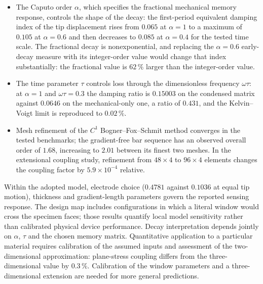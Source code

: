 \begin{itemize}
  couplings spans $2.9\times10^{-4}$ to $7.0\times10^{-3}$ and reaches
  $0.1\,\%$ only below $h=5.3\,\si{\micro\meter}$.
\item The Caputo order $\alpha$, which specifies the fractional mechanical memory response, controls the shape of the decay: the first-period
  equivalent damping index of the tip displacement rises from $0.065$ at
  $\alpha=1$ to a maximum of $0.105$ at $\alpha=0.6$ and then decreases
  to $0.085$ at $\alpha=0.4$ for
  the tested time scale. The fractional decay is nonexponential, and replacing
  the $\alpha=0.6$ early-decay measure with its integer-order value would change that index substantially: the fractional value is
  $62\,\%$ larger than the integer-order value.
\item The time parameter $\tau$ controls loss through the
  dimensionless frequency $\omega\tau$: at $\alpha=1$ and
  $\omega\tau=0.3$ the damping ratio is $0.15003$ on the condensed matrix
  against $0.0646$ on the mechanical-only one, a ratio of $0.431$, and the
  Kelvin--Voigt limit is reproduced to $0.02\,\%$.
\item Mesh refinement of the $C^1$ Bogner--Fox--Schmit method converges
  in the tested benchmarks; the gradient-free bar sequence has
  an observed overall order of $1.68$, increasing to $2.01$ between its
  finest two meshes. In the extensional coupling study, refinement from
  $48\times4$ to $96\times4$ elements changes the coupling factor by
  $5.9\times10^{-4}$ relative.
\end{itemize}

Within the adopted model, electrode choice ($0.4781$ against $0.1036$
at equal tip motion), thickness and gradient-length parameters govern the
reported sensing response. The design map includes configurations in which a
literal window would cross the specimen faces; those results quantify local
model sensitivity rather than calibrated physical device performance. Decay
interpretation depends jointly on $\alpha$, $\tau$ and the chosen memory
matrix. Quantitative application to a particular material requires calibration of
the assumed inputs and assessment of the two-dimensional approximation:
plane-stress coupling differs from the three-dimensional value by $0.3\,\%$.
Calibration of the window parameters and a three-dimensional extension are
needed for more general predictions.

\FloatBarrier
